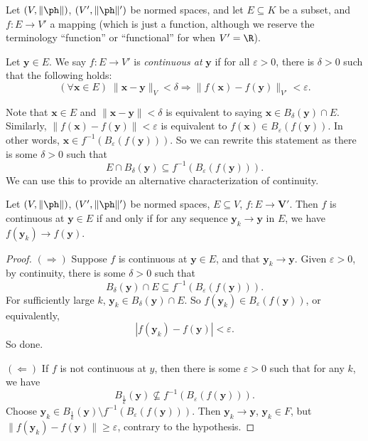 \documentclass[a4paper]{article}
\begin{document}
Let $(V, \|\ph\|)$, $(V', \|\ph\|')$ be normed spaces, and let $E \subseteq K$ be a subset, and $f: E \to V'$ a mapping (which is just a function, although we reserve the terminology ``function'' or ``functional'' for when $V' = \R$).

\begin{defi}
  Let $\mathbf{y} \in E$. We say $f: E \to V'$ is \emph{continuous at} $\mathbf{y}$ if for all $\varepsilon > 0$, there is $\delta > 0$ such that the following holds:
  \[
    (\forall \mathbf{x} \in E)\; \|\mathbf{x} - \mathbf{y}\|_V < \delta \Rightarrow \|f(\mathbf{x}) - f(\mathbf{y})\|_{V'} < \varepsilon.
  \]
\end{defi}
Note that $\mathbf{x} \in E$ and $\|\mathbf{x} - \mathbf{y}\| < \delta$ is equivalent to saying $\mathbf{x} \in B_\delta(\mathbf{y}) \cap E$. Similarly, $\|f(\mathbf{x}) - f(\mathbf{y})\| < \varepsilon$ is equivalent to $f(\mathbf{x}) \in B_\varepsilon(f(\mathbf{y}))$. In other words, $\mathbf{x} \in f^{-1}(B_\varepsilon(f(\mathbf{y})))$. So we can rewrite this statement as there is some $\delta > 0$ such that
\[
  E \cap B_\delta(\mathbf{y}) \subseteq f^{-1}(B_\varepsilon(f(\mathbf{y}))).
\]
We can use this to provide an alternative characterization of continuity.
\begin{thm}
  Let $(V, \|\ph\|)$, $(V', \|\ph\|')$ be normed spaces, $E\subseteq V$, $f: E \to \mathbf{V}'$. Then $f$ is continuous at $\mathbf{y} \in E$ if and only if for any sequence $\mathbf{y}_k \to \mathbf{y}$ in $E$, we have $f(\mathbf{y}_k) \to f(\mathbf{y})$.
\end{thm}

\begin{proof}
  $(\Rightarrow)$ Suppose $f$ is continuous at $\mathbf{y} \in E$, and that $\mathbf{y}_k \to \mathbf{y}$. Given $\varepsilon > 0$, by continuity, there is some $\delta > 0$ such that
  \[
    B_\delta(\mathbf{y}) \cap E \subseteq f^{-1}(B_\varepsilon(f(\mathbf{y}))).
  \]
  For sufficiently large $k$, $\mathbf{y}_k \in B_\delta(\mathbf{y}) \cap E$. So $f(\mathbf{y}_k) \in B_\varepsilon(f(\mathbf{y}))$, or equivalently,
  \[
    |f(\mathbf{y}_k) - f(\mathbf{y})| < \varepsilon.
  \]
  So done.

  $(\Leftarrow)$ If $f$ is not continuous at $y$, then there is some $\varepsilon > 0$ such that for any $k$, we have
  \[
    B_{\frac{1}{k}}(\mathbf{y}) \not\subseteq f^{-1}(B_\varepsilon(f(\mathbf{y}))).
  \]
  Choose $\mathbf{y}_k \in B_{\frac{1}{k}}(\mathbf{y}) \setminus f^{-1}(B_{\varepsilon}(f(\mathbf{y})))$. Then $\mathbf{y}_k \to \mathbf{y}$, $\mathbf{y}_k \in F$, but $\|f(\mathbf{y}_k) - f(\mathbf{y})\| \geq \varepsilon$, contrary to the hypothesis.
\end{proof}
\end{document}
